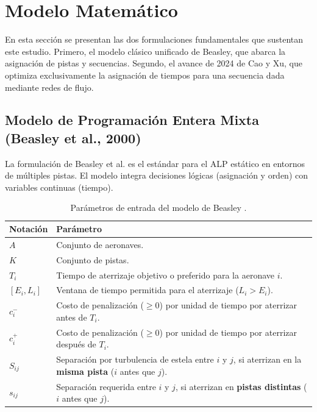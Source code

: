 \documentclass[letter, 10pt]{article}
\begin{document}
\section{Modelo Matem\'atico}

En esta secci\'on se presentan las dos formulaciones fundamentales que sustentan este estudio. Primero, el modelo cl\'asico unificado de Beasley, que abarca la asignaci\'on de pistas y secuencias. Segundo, el avance de 2024 de Cao y Xu, que optimiza exclusivamente la asignaci\'on de tiempos para una secuencia dada mediante redes de flujo.

\subsection{Modelo de Programaci\'on Entera Mixta (Beasley et al., 2000)\cite{beasley2000}}

La formulaci\'on de Beasley et al. \cite{beasley2000} es el est\'andar para el ALP est\'atico en entornos de m\'ultiples pistas. El modelo integra decisiones l\'ogicas (asignaci\'on y orden) con variables continuas (tiempo).

\begin{table}[htbp]
\centering
\renewcommand{\arraystretch}{1.2}
\begin{tabular}{|l|p{11.5cm}|}
\hline
\textbf{Notaci\'on} & \textbf{Par\'ametro} \\
\hline
$A$ & Conjunto de aeronaves. \\
$K$ & Conjunto de pistas. \\
$T_i$ & Tiempo de aterrizaje objetivo o preferido para la aeronave $i$. \\
$[E_i, L_i]$ & Ventana de tiempo permitida para el aterrizaje ($L_i > E_i$). \\
$c_i^-$ & Costo de penalizaci\'on ($\geq 0$) por unidad de tiempo por aterrizar antes de $T_i$. \\
$c_i^+$ & Costo de penalizaci\'on ($\geq 0$) por unidad de tiempo por aterrizar despu\'es de $T_i$. \\
$S_{ij}$ & Separaci\'on por turbulencia de estela entre $i$ y $j$, si aterrizan en la \textbf{misma pista} ($i$ antes que $j$). \\
$s_{ij}$ & Separaci\'on requerida entre $i$ y $j$, si aterrizan en \textbf{pistas distintas} ($i$ antes que $j$). \\
\hline
\end{tabular}
\caption{Par\'ametros de entrada del modelo de Beasley \cite{beasley2000}.}
\end{table}
\end{document}
